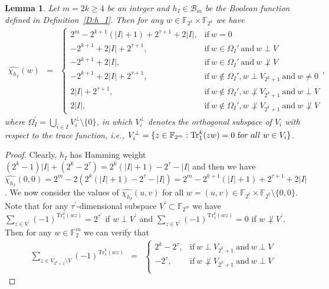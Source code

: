 \documentclass[10pt]{article}
\newtheorem{lemma}{Lemma}
\newcommand{\F}{\mathbb{F}}
\newcommand{\0}{\textbf{0}}
\newcommand{\1}{\textbf{1}}
\newcommand{\tr}{\mathrm{Tr}_1^k}
\newcommand{\W}[2][]{\widehat{\chi_{#2}}^{#1}}
\newcommand{\CardI}{\left|I\right|}
\begin{document}
{\begin{lemma}\label{L:Walsh-PSRevised}
Let $m=2k\geq 4$ be an integer and $h_I\in\mathcal{B}_m$ be the Boolean function defined in Definition~\ref{D:h_I}.
Then for any $w\in\F_{2^k}\times\F_{2^k}$ we have
\begin{eqnarray*}\label{E:WalshPS}
\W{h_I}(w)
&=& \left\{
\begin{array}{llllll}
2^m-2^{k+1}(\CardI+1)+2^{\tau+1}+2\CardI,&\mathrm{if~}w=0\\
-2^{k+1}+2\CardI+2^{\tau+1},&\mathrm{if~}w\in\Omega_I'\mathrm{~and~} w \perp V\\
-2^{k+1}+2\CardI,&\mathrm{if~}w\in\Omega_I'\mathrm{~and~} w \not\perp V\\
-2^{k+1}+2\CardI+2^{\tau+1},&\mathrm{if~}w\not\in\Omega_I', w \perp V_{2^k+1} \mathrm{~and~} w\ne 0\\
2\CardI+2^{\tau+1},&\mathrm{if~}w\not\in\Omega_I', w \not\perp V_{2^k+1}\mathrm{~and~} w \perp V\\
2\CardI,&\mathrm{if~}w\not\in\Omega_I', w \not\perp V_{2^k+1}\mathrm{~and~} w \not\perp V
\end{array}
\right.,
\end{eqnarray*}
where $\Omega_I^\prime=\bigcup_{i\in I}V_i^\bot\setminus \{0\}$,
in which $V_i^\bot$ denotes the orthogonal subspace of $V_i$ with respect to the trace function, i.e., $V_i^\bot=\{z \in \F_{2^m} : \tr(zw)=0~{\text for~all}~w\in V_i\}$.
\end{lemma}
\begin{proof}
Clearly, $h_I$ has Hamming weight $(2^k-1)\CardI+(2^k-2^\tau)=2^k(\CardI+1)-2^\tau-\CardI$ and then
we have $\W{h_I}(0,0)=2^m-2(2^k(\CardI+1)-2^\tau-\CardI)=2^m-2^{k+1}(\CardI+1)+2^{\tau+1}+2\CardI$.
We now consider the values of $\widehat{\chi_{h_I}}(u,v)$ for all $w=(u,v)\in\F_{2^k}\times\F_{2^k}\setminus\{0,0\}$.
Note that for any $\tau^\prime$-dimensional subspace $V^\prime\subset\F_{2^m}$ we have
$\sum_{z\in V^\prime}(-1)^{\tr(w z)}=2^{\tau^\prime}$ if $w\perp V^\prime$ and $\sum_{z\in V^\prime}(-1)^{\tr(wz)}=0$ if $w\not\perp V^\prime$.
Then for any $w\in\F_2^m$ we can verify that
\begin{eqnarray*}
\sum_{z\in V_{2^k+1}\setminus V} (-1)^{\tr(wz)}
&=& \left\{
\begin{array}{llllll}
2^k-2^{\tau},&\mathrm{if~}w \perp V_{2^k+1}\mathrm{~and~} w \perp V\\
-2^{\tau},&\mathrm{if~}w \not\perp V_{2^k+1}\mathrm{~and~} w \perp V\\

\end{array}
\end{eqnarray*}
\end{proof}}
\end{document}
